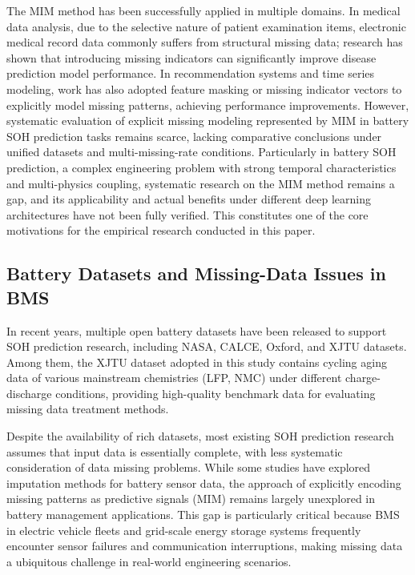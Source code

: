 \documentclass[5p,times]{elsarticle}
\begin{document}
The MIM method has been successfully applied in multiple domains. In medical data analysis, due to the selective nature of patient examination items, electronic medical record data commonly suffers from structural missing data; research has shown that introducing missing indicators can significantly improve disease prediction model performance\cite{sisk2023imputation,ehrig2025imputation}. In recommendation systems and time series modeling, work has also adopted feature masking or missing indicator vectors to explicitly model missing patterns, achieving performance improvements\cite{ipsen2022deal,che2018recurrent}. However, systematic evaluation of explicit missing modeling represented by MIM in battery SOH prediction tasks remains scarce, lacking comparative conclusions under unified datasets and multi-missing-rate conditions. Particularly in battery SOH prediction, a complex engineering problem with strong temporal characteristics and multi-physics coupling, systematic research on the MIM method remains a gap, and its applicability and actual benefits under different deep learning architectures have not been fully verified. This constitutes one of the core motivations for the empirical research conducted in this paper.

\subsection{Battery Datasets and Missing-Data Issues in BMS}

In recent years, multiple open battery datasets have been released to support SOH prediction research, including NASA, CALCE, Oxford, and XJTU datasets\cite{severson2019data,wang2024open,duan2025lithium,wang2024pinn}. Among them, the XJTU dataset adopted in this study contains cycling aging data of various mainstream chemistries (LFP, NMC) under different charge-discharge conditions, providing high-quality benchmark data for evaluating missing data treatment methods.

Despite the availability of rich datasets, most existing SOH prediction research assumes that input data is essentially complete, with less systematic consideration of data missing problems\cite{shao2025soh,deng2025novel,chen2024batteryMissing}. While some studies have explored imputation methods for battery sensor data\cite{li2023bmsImputation}, the approach of explicitly encoding missing patterns as predictive signals (MIM) remains largely unexplored in battery management applications. This gap is particularly critical because BMS in electric vehicle fleets and grid-scale energy storage systems frequently encounter sensor failures and communication interruptions, making missing data a ubiquitous challenge in real-world engineering scenarios.
\end{document}

